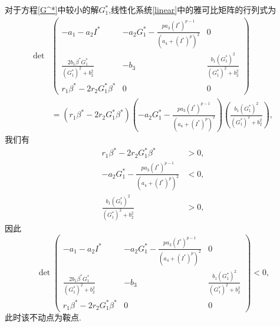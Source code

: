 对于方程\ref{G^*}中较小的解$G_1^*$,线性化系统\ref{linear}中的雅可比矩阵的行列式为
\begin{equation}
    \begin{aligned}
        \det&\begin{pmatrix}
            -a_1-a_2I^*                                & -a_2G_1^*-\frac{pa_3(I^*)^{p-1}}{(a_4+(I^*)^p)^2} & 0                                      \\
            \frac{2b_1\beta^*G_1^*}{(G_1^*)^2 + b_2^2} & -b_3                                              & \frac{b_1(G_1^*)^2}{(G_1^*)^2 + b_2^2} \\
            r_1\beta^*-2r_2G_1^*\beta^*                & 0                                                 & 0
        \end{pmatrix}\\
        &=(r_1\beta^*-2r_2G_1^*\beta^*)(-a_2G_1^*-\frac{pa_3(I^*)^{p-1}}{(a_4+(I^*)^p)^2})( \frac{b_1(G_1^*)^2}{(G_1^*)^2 + b_2^2}),
    \end{aligned}
\end{equation}
我们有
\begin{equation}
    \begin{aligned}
        r_1\beta^*-2r_2G_1^*\beta^*                       & >0, \\
        -a_2G_1^*-\frac{pa_3(I^*)^{p-1}}{(a_4+(I^*)^p)^2} & <0, \\
        \frac{b_1(G_1^*)^2}{(G_1^*)^2 + b_2^2}            & >0,
    \end{aligned}
\end{equation}
因此\begin{equation}
    \det\begin{pmatrix}
        -a_1-a_2I^*                                & -a_2G_1^*-\frac{pa_3(I^*)^{p-1}}{(a_4+(I^*)^p)^2} & 0                                     \\
        \frac{2b_1\beta^*G_1^*}{(G_1^*)^2 + b_2^2} & -b_3                                              & \frac{b_1(G_1^*)^2}{(G_1^*)^2 + b_2^2} \\
        r_1\beta^*-2r_2G_1^*\beta^*                & 0                                                 & 0
    \end{pmatrix}<0,
\end{equation}
此时该不动点为鞍点. 

